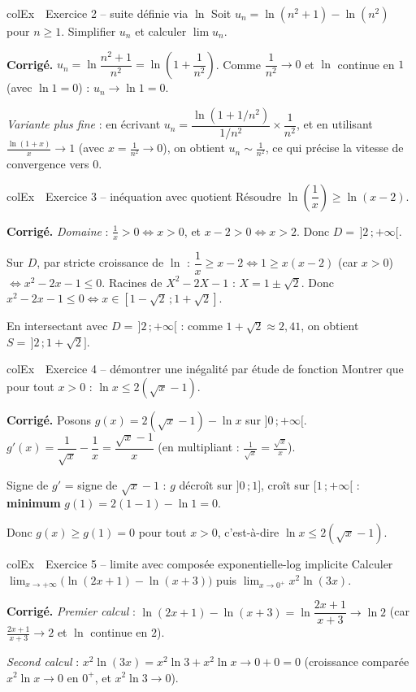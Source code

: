 \documentclass[11pt,a4paper]{article}
\newenvironment{exemple}[1][Exemple]
  {\begin{fiche}{colEx}{\ding{217}~~#1}}{\end{fiche}}
\begin{document}
\begin{exemple}[Exercice 2 -- suite définie via $\ln$]
Soit $u_n=\ln(n^2+1)-\ln(n^2)$ pour $n\geq1$. Simplifier $u_n$ et calculer $\lim u_n$.

\smallskip
\textbf{Corrigé.} $u_n=\ln\dfrac{n^2+1}{n^2}=\ln\left(1+\dfrac{1}{n^2}\right)$. Comme $\dfrac{1}{n^2}\to0$ et $\ln$ continue en $1$ (avec $\ln1=0$) : $u_n\to\ln1=0$.

\smallskip
\emph{Variante plus fine} : en écrivant $u_n = \dfrac{\ln(1+1/n^2)}{1/n^2}\times\dfrac{1}{n^2}$, et en utilisant $\frac{\ln(1+x)}{x}\to1$ (avec $x=\frac{1}{n^2}\to0$), on obtient $u_n \sim \frac{1}{n^2}$, ce qui précise la vitesse de convergence vers $0$.
\end{exemple}

\begin{exemple}[Exercice 3 -- inéquation avec quotient]
Résoudre $\ln\left(\dfrac{1}{x}\right) \geq \ln(x-2)$.

\smallskip
\textbf{Corrigé.} \emph{Domaine} : $\frac1x>0 \iff x>0$, et $x-2>0 \iff x>2$. Donc $D=\,]2\,;+\infty[$.

\smallskip
Sur $D$, par stricte croissance de $\ln$ : $\dfrac{1}{x}\geq x-2 \iff 1 \geq x(x-2)$ (car $x>0$) $\iff x^2-2x-1\leq0$. Racines de $X^2-2X-1$ : $X=1\pm\sqrt2$. Donc $x^2-2x-1\leq0 \iff x\in[1-\sqrt2\,;1+\sqrt2]$.

\smallskip
En intersectant avec $D=\,]2\,;+\infty[$ : comme $1+\sqrt2\approx2{,}41$, on obtient $S=\,]2\,;1+\sqrt2]$.
\end{exemple}

\begin{exemple}[Exercice 4 -- démontrer une inégalité par étude de fonction]
Montrer que pour tout $x>0$ : $\ln x \leq 2(\sqrt x - 1)$.

\smallskip
\textbf{Corrigé.} Posons $g(x) = 2(\sqrt x-1) - \ln x$ sur $]0\,;+\infty[$. $g'(x) = \dfrac{1}{\sqrt x} - \dfrac1x = \dfrac{\sqrt x - 1}{x}$ (en multipliant : $\frac{1}{\sqrt x}=\frac{\sqrt x}{x}$).

\smallskip
Signe de $g'$ = signe de $\sqrt x - 1$ : $g$ décroît sur $]0\,;1]$, croît sur $[1\,;+\infty[$ : \textbf{minimum} $g(1) = 2(1-1)-\ln1 = 0$.

\smallskip
Donc $g(x)\geq g(1) = 0$ pour tout $x>0$, c'est-à-dire $\ln x \leq 2(\sqrt x-1)$.
\end{exemple}

\begin{exemple}[Exercice 5 -- limite avec composée exponentielle-log implicite]
Calculer $\displaystyle\lim_{x\to+\infty}\bigl(\ln(2x+1)-\ln(x+3)\bigr)$ puis $\displaystyle\lim_{x\to0^+} x^2\ln(3x)$.

\smallskip
\textbf{Corrigé.} \emph{Premier calcul} : $\ln(2x+1)-\ln(x+3)=\ln\dfrac{2x+1}{x+3}\to\ln2$ (car $\frac{2x+1}{x+3}\to2$ et $\ln$ continue en $2$).

\smallskip
\emph{Second calcul} : $x^2\ln(3x) = x^2\ln3 + x^2\ln x \to 0 + 0 = 0$ (croissance comparée $x^2\ln x\to0$ en $0^+$, et $x^2\ln3\to0$).
\end{exemple}
\end{document}
